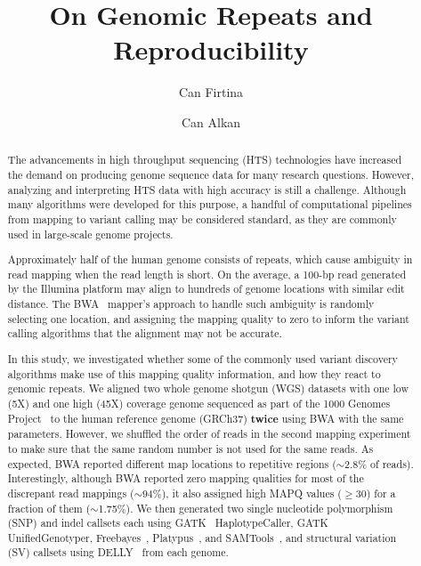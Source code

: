 \documentclass[10pt,a4paper]{article}
\date{}
\def\titulo#1{\title{#1}}
\begin{document}
\titulo{On Genomic Repeats and Reproducibility}

\author[1]{Can Firtina}
\author[1]{Can Alkan}

\maketitle
\thispagestyle{empty}


\begin{abstract}
The advancements in high throughput sequencing (HTS) technologies have increased the demand on producing  genome sequence data for many research questions. However, analyzing and interpreting HTS data with high accuracy is still a challenge. 
Although many algorithms were developed for this purpose, a handful of computational pipelines from mapping to variant calling may be considered standard, as they are commonly used in large-scale genome projects.

Approximately half of the human genome consists of repeats, which cause ambiguity in read mapping when the read length is short. On the average, a 100-bp read generated by the Illumina platform may align to hundreds of genome locations with similar edit distance. 
The BWA~\cite{Li2009a} mapper's  approach to handle such ambiguity is randomly selecting one location, and assigning the mapping quality to zero to inform the variant calling algorithms that the alignment may not be accurate. 

In this study, we investigated whether some of the commonly used variant discovery algorithms
make use of this mapping quality information, and how they react to genomic repeats.
We aligned two whole genome shotgun (WGS) datasets with one low (5X) and one high (45X) coverage genome
sequenced as part of the 1000 Genomes Project~\cite{1000GP2012} to the human reference genome (GRCh37) {\bf twice} using BWA with the same parameters. However, we shuffled the order of reads in the second mapping experiment to make sure that the same random number is not used for the same reads.
As expected, BWA reported different map locations to repetitive regions ($\sim$2.8\% of reads). Interestingly, although BWA reported zero mapping qualities for 
most of the discrepant read mappings ($\sim$94\%), it also assigned high MAPQ values ($\geq$30) for a fraction of them ($\sim$1.75\%). 
We then generated two single nucleotide polymorphism (SNP) and indel callsets each using GATK~\cite{DePristo2011} HaplotypeCaller, GATK UnifiedGenotyper, Freebayes~\cite{Garrison2012}, Platypus~\cite{Rimmer2014}, and SAMTools~\cite{Li2009b}, and structural variation (SV) callsets using DELLY~\cite{Rausch2012} from each genome.


\end{abstract}
\end{document}
